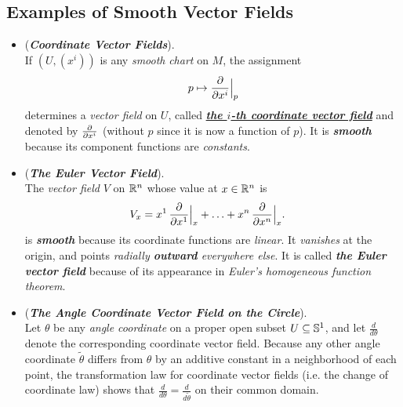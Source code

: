 \documentclass[11pt]{article}
\begin{document}
\subsection{Examples of Smooth Vector Fields}
\begin{itemize}
\item 
\begin{example} (\emph{\textbf{Coordinate Vector Fields}}). \\
If $(U, (x^i))$ is any \emph{smooth} \emph{chart} on $M$, the assignment
\begin{align*}
p \mapsto \frac{\partial }{ \partial x^{i}}\Bigr|_{p}
\end{align*} determines a \emph{vector field} on $U$, called \underline{\emph{\textbf{the $i$-th coordinate vector field}}} and denoted by $\frac{\partial }{ \partial x^{i}}$ (without $p$ since it is now a function of $p$). It is \emph{\textbf{smooth}} because its component functions are \emph{constants}.
\end{example}

\item \begin{example} (\emph{\textbf{The Euler Vector Field}}). \\
The \emph{vector field} $V$ on ${\mathbb R}^n$ whose value at $x \in {\mathbb R}^n$ is
\begin{align*}
V_x & = x^{1}\,\frac{\partial }{ \partial x^{1}}\Bigr|_{x} + \ldots + x^{n}\,\frac{\partial }{ \partial x^{n}}\Bigr|_{x}.
\end{align*} is \emph{\textbf{smooth}} because its coordinate functions are \emph{linear}. It \emph{vanishes} at the origin, and points \emph{radially \textbf{outward} everywhere else}. It is called \emph{\textbf{the Euler vector field}} because of its appearance in \emph{Euler’s homogeneous function theorem}.
\end{example}

\item \begin{example} (\emph{\textbf{The Angle Coordinate Vector Field on the Circle}}).\\
Let $\theta$ be any \emph{angle coordinate} on a proper open subset $U \subseteq {\mathbb S}^1$, and let $\frac{d}{d\theta}$ denote the corresponding coordinate vector field. Because any other angle coordinate $\widetilde{\theta}$ differs from $\theta$ by an additive constant in a neighborhood of each point, the transformation law for coordinate vector fields (i.e. the change of coordinate law) shows that $\frac{d}{d\theta} = \frac{d}{d\widetilde{\theta}}$ on their common domain. 


\end{example}
\end{itemize}
\end{document}

